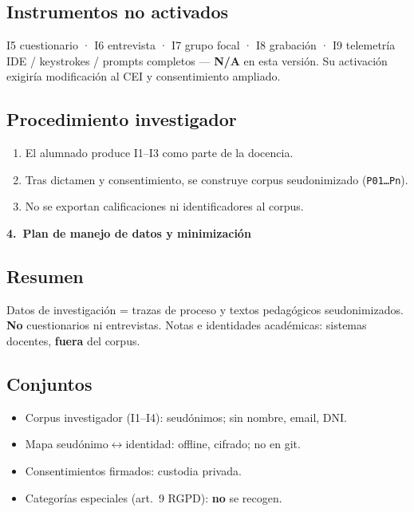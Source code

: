 \documentclass[11pt,a4paper]{scrartcl}
\newcommand{\AnnexTitle}[1]{%
  \clearpage
  \LogoRow
  \begin{center}{\Large\sffamily\bfseries #1}\end{center}
  \vspace{0.4em}
  \noindent{\color{rulegray}\hrule height 0.4pt}
  \vspace{0.5em}
}
\begin{document}
\subsection*{Instrumentos no activados}
I5 cuestionario · I6 entrevista · I7 grupo focal · I8 grabación · I9 telemetría IDE /
keystrokes / prompts completos --- \textbf{N/A} en esta versión. Su activación
exigiría modificación al CEI y consentimiento ampliado.

\subsection*{Procedimiento investigador}
\begin{enumerate}
  \item El alumnado produce I1--I3 como parte de la docencia.
  \item Tras dictamen y consentimiento, se construye corpus seudonimizado (\texttt{P01\ldots Pn}).
  \item No se exportan calificaciones ni identificadores al corpus.
\end{enumerate}

\AnnexTitle{4.\ Plan de manejo de datos y minimización}

\subsection*{Resumen}
Datos de investigación = trazas de proceso y textos pedagógicos seudonimizados.
\textbf{No} cuestionarios ni entrevistas. Notas e identidades académicas:
sistemas docentes, \textbf{fuera} del corpus.

\subsection*{Conjuntos}
\begin{itemize}
  \item Corpus investigador (I1--I4): seudónimos; sin nombre, email, DNI.
  \item Mapa seudónimo$\leftrightarrow$identidad: offline, cifrado; no en git.
  \item Consentimientos firmados: custodia privada.
  \item Categorías especiales (art.~9 RGPD): \textbf{no} se recogen.
\end{itemize}
\end{document}
